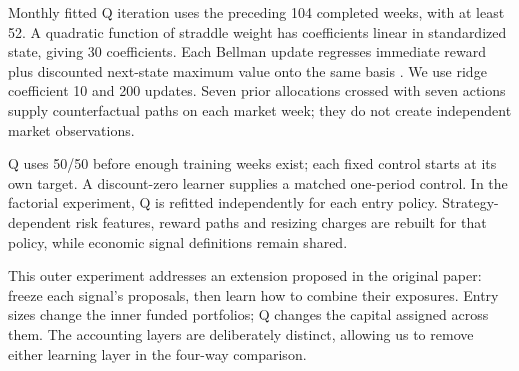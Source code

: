 Monthly fitted Q iteration uses the preceding 104 completed weeks, with at least 52. A quadratic function of straddle weight has coefficients linear in standardized state, giving 30 coefficients. Each Bellman update regresses immediate reward plus discounted next-state maximum value onto the same basis \cite{ernst2005}. We use ridge coefficient 10 and 200 updates. Seven prior allocations crossed with seven actions supply counterfactual paths on each market week; they do not create independent market observations.


Q uses 50/50 before enough training weeks exist; each fixed control starts at its own target. A discount-zero learner supplies a matched one-period control. In the factorial experiment, Q is refitted independently for each entry policy. Strategy-dependent risk features, reward paths and resizing charges are rebuilt for that policy, while economic signal definitions remain shared.


This outer experiment addresses an extension proposed in the original paper: freeze each signal's proposals, then learn how to combine their exposures. Entry sizes change the inner funded portfolios; Q changes the capital assigned across them. The accounting layers are deliberately distinct, allowing us to remove either learning layer in the four-way comparison.
